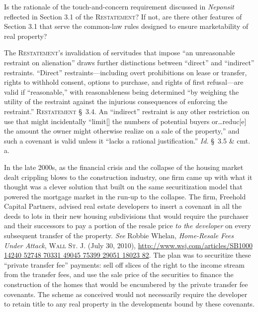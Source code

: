 
\item Is the rationale of the touch-and-concern requirement discussed in
\textit{Neponsit} reflected in Section 3.1 of the \textsc{Restatement}? If not,
are there
other features of Section 3.1 that serve the common-law rules designed to ensure
marketability of real property?

\item The \textsc{Restatement}'s invalidation of servitudes that impose ``an
unreasonable
restraint on alienation'' draws further distinctions between ``direct'' and
``indirect'' restraints. ``Direct'' restraints---including overt prohibitions on
lease or transfer, rights to withhold consent, options to purchase, and rights
of first refusal---are valid if ``reasonable,'' with reasonableness being
determined ``by weighing the utility of the restraint against the injurious
consequences of enforcing the restraint.'' \textsc{Restatement} \S~3.4. An
``indirect'' restraint is any other restriction on use that might incidentally
``limit[] the numbers of potential buyers or\ldots reduc[e] the amount the owner
might otherwise realize on a sale of the property,'' and such a covenant is
valid unless it ``lacks a rational justification.'' \textit{Id.} \S~3.5 \& cmt.
a.

\item In the late 2000s, as the financial crisis and the collapse of the housing
market dealt crippling blows to the construction industry, one firm came up with
what it thought was a clever solution that built on the same securitization
model that powered the mortgage market in the run-up to the collapse. The firm,
Freehold Capital Partners, advised real estate developers to insert a covenant
in all the deeds to lots in their new housing subdivisions that would require
the purchaser and their successors to pay a portion of the resale price
\textit{to the developer} on every subsequent transfer of the property.
\textit{See} Robbie Whelan, \textit{Home-Resale Fees Under Attack}, \textsc{Wall
St. J}. (July 30, 2010),
\url{http://www.wsj.com/articles/SB1000 14240 52748 70331 49045 75399 29051
18023 82}.
The plan was to securitize these ``private transfer fee'' payments: sell off
slices of the right to the income stream from the transfer fees, and use the
sale price of the securities to finance the construction of the homes that would
be encumbered by the private transfer fee covenants. The scheme as conceived
would not necessarily require the developer to retain title to any real property
in the developments bound by these covenants.


